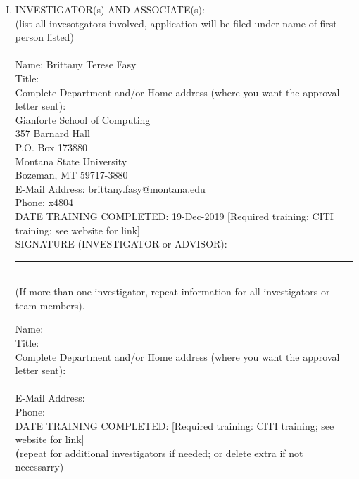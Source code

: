 \documentclass{article}
\newcommand{\response}[1]{{\color{blue}#1}}
\begin{document}
\begin{enumerate}[I.]

    \item INVESTIGATOR(s) AND ASSOCIATE(s):\\
        (list all invesotgators involved, application will be filed under name of first\\
        person listed)\\
        \\
        Name: \response{Brittany Terese Fasy}\\
        Title: \\
        Complete Department and/or Home address (where you want the approval
        letter sent):\\
            \response{
            Gianforte School of Computing\\
            357 Barnard Hall\\
            P.O. Box 173880\\
            Montana State University\\
            Bozeman, MT 59717-3880}\\
        E-Mail Address: \response{brittany.fasy@montana.edu}\\
        Phone: \response{x4804} \\
        DATE TRAINING COMPLETED: \response{19-Dec-2019} [Required training: CITI
        training; see website for link]\\


        SIGNATURE (INVESTIGATOR or ADVISOR):\rule{0.5\linewidth}{\linethickness}   \\

        (If more than one investigator, repeat information for all investigators
        or team members).

        Name: \\
        Title: \\
        Complete Department and/or Home address (where you want the approval
        letter sent):\\
            \\
        E-Mail Address: \\
        Phone: \\
        DATE TRAINING COMPLETED: [Required training: CITI
        training; see website for link]\\

        \textbf(repeat for additional investigators if needed; or delete extra if not necessarry)\\


\end{enumerate}
\end{document}
